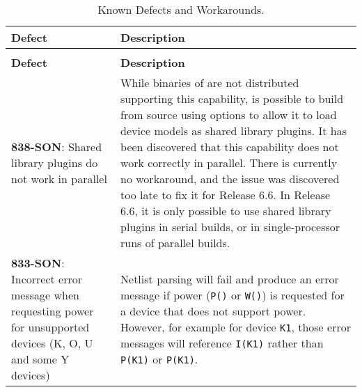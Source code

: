 




{
\small

\begin{longtable}[h] {>{\raggedright\small}m{2in}|>{\raggedright\let\\\tabularnewline\small}m{3.5in}}
  \caption{Known Defects and Workarounds.} \\ \hline
  \rowcolor{XyceDarkBlue} \color{white}\bf Defect & \color{white}\bf Description
  \\ \hline \endfirsthead
  \caption[]{Known Defects and Workarounds.} \\ \hline
  \rowcolor{XyceDarkBlue} \color{white}\bf Defect & \color{white}\bf Description
  \\ \hline \endhead

%
%  

\textbf{838-SON}: Shared library plugins do not work in parallel &  While binaries of \Xyce{} are not distributed supporting this capability, is possible to build \Xyce{} from source using options to allow it to load device models as shared library plugins.  It has been discovered that this capability does not work correctly in parallel.  There is currently no workaround, and the issue was discovered too late to fix it for Release 6.6.  In Release 6.6, it is only possible to use shared library plugins in serial builds, or in single-processor runs of parallel builds.
\\ \hline

\textbf{833-SON}: Incorrect error message when requesting power for unsupported 
devices (K, O, U and some Y devices) &  Netlist parsing will fail and produce 
an error message if power (\texttt{P()} or \texttt{W()}) is requested for a device
that does not support power.  However, for example for device \texttt{K1}, those 
error messages will reference \texttt{I(K1)} rather than \texttt{P(K1)} or 
\texttt{P(K1)}. \\ \hline


\end{longtable}}
